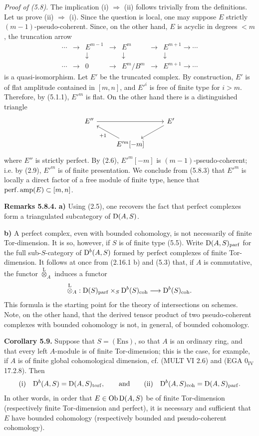 \documentclass[11pt]{article}
\begin{document}
\emph{Proof of (5.8).} The implication (i) \(\Rightarrow\) (ii) follows trivially from the definitions. Let us prove (ii) \(\Rightarrow\) (i). Since the question is local, one may suppose \(E\) strictly \((m-1)\)-pseudo-coherent. Since, on the other hand, \(E\) is acyclic in degrees \(<m\), the truncation arrow
\[
\begin{array}{ccccccc}
\cdots&\to&E^{m-1}&\to&E^m&\to&E^{m+1}\to\cdots\\
&&\downarrow&&\downarrow&&\downarrow\\
\cdots&\to&0&\to&E^m/B^m&\to&E^{m+1}\to\cdots
\end{array}
\]
is a quasi-isomorphism. Let \(E'\) be the truncated complex. By construction, \(E'\) is of flat amplitude contained in \([m,n]\), and \(E'^i\) is free of finite type for \(i>m\). Therefore, by (5.1.1), \(E'^m\) is flat. On the other hand there is a distinguished triangle
\[
\begin{tikzcd}
E'' \arrow[rr] && E' \arrow[dl]\\
& E'^m[-m] \arrow[ul,"+1"] &
\end{tikzcd}
\]
where \(E''\) is strictly perfect. By (2.6), \(E'^m[-m]\) is \((m-1)\)-pseudo-coherent; i.e. by (2.9), \(E'^m\) is of finite presentation. We conclude from (5.8.3) that \(E'^m\) is locally a direct factor of a free module of finite type, hence that \(\operatorname{perf.amp}(E)\subset[m,n]\).

\textbf{Remarks 5.8.4.} \textbf{a)} Using (2.5), one recovers the fact that perfect complexes form a triangulated subcategory of \(\mathrm D(A,S)\).

\textbf{b)} A perfect complex, even with bounded cohomology, is not necessarily of finite Tor-dimension. It is so, however, if \(S\) is of finite type (5.5). Write \(\mathrm D(A,S)_{\mathrm{parf}}\) for the full sub-\(S\)-category of \(\mathrm D^b(A,S)\) formed by perfect complexes of finite Tor-dimension. It follows at once from (2.16.1 b) and (5.3) that, if \(A\) is commutative, the functor \(\overset{\mathrm L}{\otimes}_A\) induces a functor
\[
  \overset{\mathrm L}{\otimes}_A:
  \mathrm D(S)_{\mathrm{parf}}\times_S \mathrm D^b(S)_{\mathrm{coh}}
  \longrightarrow \mathrm D^b(S)_{\mathrm{coh}}.
\]
This formula is the starting point for the theory of intersections on schemes. Note, on the other hand, that the derived tensor product of two pseudo-coherent complexes with bounded cohomology is not, in general, of bounded cohomology.

\textbf{Corollary 5.9.} Suppose that \(S=(\mathrm{Ens})\), so that \(A\) is an ordinary ring, and that every left \(A\)-module is of finite Tor-dimension; this is the case, for example, if \(A\) is of finite global cohomological dimension, cf. (MULT VI 2.6) and (EGA \(0_{\mathrm{IV}}\) 17.2.8). Then
\[
\text{(i)}\quad \mathrm D^b(A,S)=\mathrm D(A,S)_{\operatorname{torf}},
\qquad
\text{and}
\qquad
\text{(ii)}\quad \mathrm D^b(A,S)_{\mathrm{coh}}=\mathrm D(A,S)_{\mathrm{parf}}.
\]
In other words, in order that \(E\in\operatorname{Ob}\mathrm D(A,S)\) be of finite Tor-dimension (respectively finite Tor-dimension and perfect), it is necessary and sufficient that \(E\) have bounded cohomology (respectively bounded and pseudo-coherent cohomology).
\end{document}

